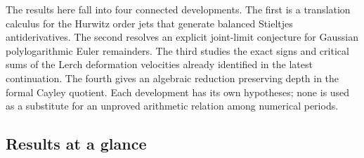 \documentclass[11pt,a4paper]{article}
\numberwithin{equation}{section}
\theoremstyle{definition}
\theoremstyle{remark}
\begin{document}
The results here fall into four connected developments. The first is a
translation calculus for the Hurwitz order jets that generate balanced
Stieltjes antiderivatives. The second resolves an explicit joint-limit
conjecture for Gaussian polylogarithmic Euler remainders. The third studies
the exact signs and critical sums of the Lerch deformation velocities
already identified in the latest continuation. The fourth gives an
algebraic reduction preserving depth in the formal Cayley quotient.
Each development has its own hypotheses; none is used as a substitute for
an unproved arithmetic relation among numerical periods.

\subsection{Results at a glance}
\end{document}
